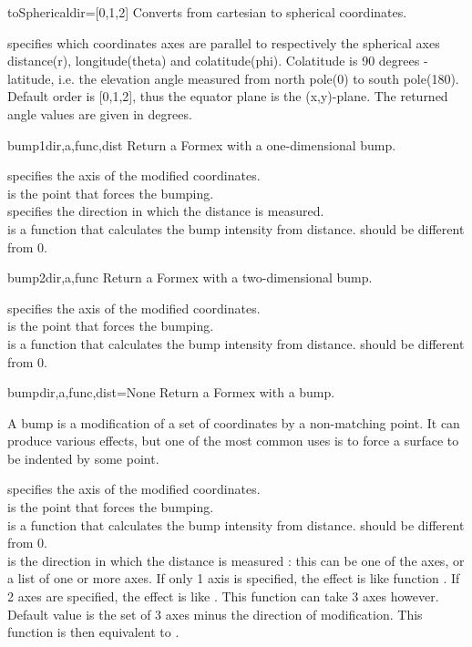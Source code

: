 \begin{methoddesc}{toSpherical}{dir=[0,1,2]}
Converts from cartesian to spherical coordinates.

 specifies which coordinates axes are parallel to respectively the spherical axes distance(r), longitude(theta) and colatitude(phi). Colatitude is 90 degrees - latitude, i.e. the elevation angle measured from north pole(0) to south pole(180). Default order is [0,1,2], thus the equator plane is the (x,y)-plane. The returned angle values are given in degrees.
\end{methoddesc}

\begin{methoddesc}{bump1}{dir,a,func,dist}
Return a Formex with a one-dimensional bump.

 specifies the axis of the modified coordinates.\\
 is the point that forces the bumping.\\
 specifies the direction in which the distance is measured.\\
 is a function that calculates the bump intensity from distance.  should be different from 0.
\end{methoddesc}

\begin{methoddesc}{bump2}{dir,a,func}
Return a Formex with a two-dimensional bump.

 specifies the axis of the modified coordinates.\\
 is the point that forces the bumping.\\
 is a function that calculates the bump intensity from distance.  should be different from 0.
\end{methoddesc}

\begin{methoddesc}{bump}{dir,a,func,dist=None}
Return a Formex with a bump.

A bump is a modification of a set of coordinates by a non-matching point. It can produce various effects, but one of the most common uses is to force a surface to be indented by some point.
        
 specifies the axis of the modified coordinates.\\
 is the point that forces the bumping.\\
 is a function that calculates the bump intensity from distance.  should be different from 0.\\
 is the direction in which the distance is measured : this can be one of the axes, or a list of one or more axes. If only 1 axis is specified, the effect is like function . If 2 axes are specified, the effect is like . This function can take 3 axes however. Default value is the set of 3 axes minus the direction of modification. This function is then equivalent to .
\end{methoddesc}

